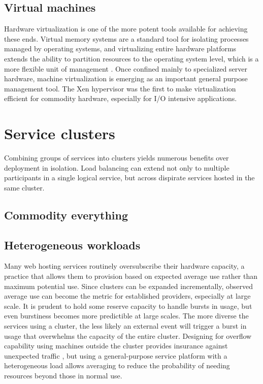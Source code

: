\subsection{Virtual machines}

Hardware virtualization is one of the more potent tools available for achieving these ends. Virtual memory systems are a standard tool for isolating processes managed by operating systems, and virtualizing entire hardware platforms extends the ability to partition resources to the operating system level, which is a more flexible unit of management \cite{hand}. Once confined mainly to specialized server hardware, machine virtualization is emerging as an important general purpose management tool. The Xen hypervisor \cite{barham} was the first to make virtualization efficient for commodity hardware, especially for I/O intensive applications.

\section{Service clusters}

Combining groups of services into clusters yields numerous benefits over deployment in isolation. Load balancing can extend not only to multiple participants in a single logical service, but across dispirate services hosted in the same cluster.

\subsection{Commodity everything}

\subsection{Heterogeneous workloads}

Many web hosting services routinely oversubscribe their hardware capacity, a practice that allows them to provision based on expected average use rather than maximum potential use. Since clusters can be expanded incrementally, observed average use can become the metric for established providers, especially at large scale. It is prudent to hold some reserve capacity to handle bursts in usage, but even burstiness becomes more predictible at large scales. The more diverse the services using a cluster, the less likely an external event will trigger a burst in usage that overwhelms the capacity of the entire cluster. Designing for overflow capability using machines outside the cluster provides insurance against unexpected traffic \cite{fox}, but using a general-purpose service platform with a heterogeneous load allows averaging to reduce the probability of needing resources beyond those in normal use.

